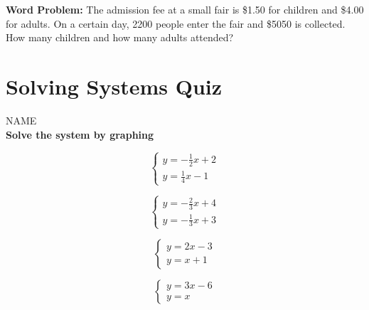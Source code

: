 \documentclass[11pt]{article}
\begin{document}
\hrulefill

\textbf{Word Problem:} The admission fee at a small fair is \$1.50 for children and \$4.00 for adults. On a certain day, 2200 people enter the fair and \$5050 is collected. How many children and how many adults attended?

\pagebreak %

\section*{Solving Systems Quiz}

\vspace{12pt}

NAME\underline{\hspace{3in}}\\


\textbf{Solve the system by graphing}\\

\begin{multicols}{2}

\begin{equation*}
	\begin{cases}
		y=-\frac{1}{2}x+2\\
		y=\frac{1}{4}x-1	
	\end{cases}
\end{equation*}

	
\begin{center}
\end{center}

\begin{equation*}
	\begin{cases}
		y=-\frac{2}{3}x+4\\
		y=-\frac{1}{3}x+3	
	\end{cases}
\end{equation*}

	
\begin{center}
\end{center}

\begin{equation*}
	\begin{cases}
		y=2x-3\\
		y=x+1	
	\end{cases}
\end{equation*}

	
\begin{center}
\end{center}

\begin{equation*}
	\begin{cases}
		y=3x-6\\
		
		y=x	
	\end{cases}
\end{equation*}

	
\begin{center}
\end{center}

\end{multicols}
\end{document}
